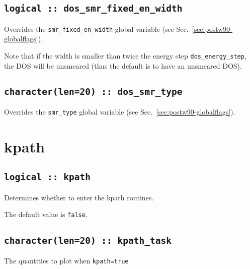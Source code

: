 \subsection[dos\_smr\_fixed\_en\_width]{\tt logical :: dos\_smr\_fixed\_en\_width}
Overrides the \verb#smr_fixed_en_width# global variable (see
Sec.~\ref{sec:postw90-globalflags}).

Note that if the width is smaller than twice the energy step {\tt dos\_energy\_step}, the DOS
will be unsmeared (thus the default is to have an unsmeared DOS).


\subsection[dos\_smr\_type]{\tt  character(len=20) :: dos\_smr\_type}
Overrides the \verb#smr_type# global variable (see Sec.~\ref{sec:postw90-globalflags}).


\clearpage
\section{kpath}

\subsection[berry]{\tt logical :: kpath}
Determines whether to enter the kpath routines.

The default value is \verb#false#.


\subsection[kpath\_task]{\tt character(len=20) ::  kpath\_task} 
The quantities to plot when {\tt kpath=true} 

